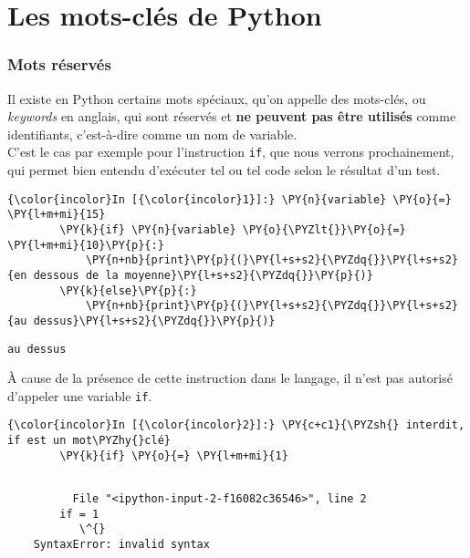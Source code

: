     \hypertarget{les-mots-cluxe9s-de-python}{%
\section{Les mots-clés de Python}\label{les-mots-cluxe9s-de-python}}

    \hypertarget{mots-ruxe9servuxe9s}{%
\subsubsection{Mots réservés}\label{mots-ruxe9servuxe9s}}

    Il existe en Python certains mots spéciaux, qu'on appelle des mots-clés,
ou \emph{keywords} en anglais, qui sont réservés et \textbf{ne peuvent
pas être utilisés} comme identifiants, c'est-à-dire comme un nom de
variable.\\

    C'est le cas par exemple pour l'instruction \texttt{if}, que nous
verrons prochainement, qui permet bien entendu d'exécuter tel ou tel
code selon le résultat d'un test.

    \begin{Verbatim}[commandchars=\\\{\}]
{\color{incolor}In [{\color{incolor}1}]:} \PY{n}{variable} \PY{o}{=} \PY{l+m+mi}{15}
        \PY{k}{if} \PY{n}{variable} \PY{o}{\PYZlt{}}\PY{o}{=} \PY{l+m+mi}{10}\PY{p}{:}
            \PY{n+nb}{print}\PY{p}{(}\PY{l+s+s2}{\PYZdq{}}\PY{l+s+s2}{en dessous de la moyenne}\PY{l+s+s2}{\PYZdq{}}\PY{p}{)}
        \PY{k}{else}\PY{p}{:}
            \PY{n+nb}{print}\PY{p}{(}\PY{l+s+s2}{\PYZdq{}}\PY{l+s+s2}{au dessus}\PY{l+s+s2}{\PYZdq{}}\PY{p}{)}
\end{Verbatim}


    \begin{Verbatim}[commandchars=\\\{\}]
au dessus

    \end{Verbatim}

    À cause de la présence de cette instruction dans le langage, il n'est
pas autorisé d'appeler une variable \texttt{if}.

    \begin{Verbatim}[commandchars=\\\{\}]
{\color{incolor}In [{\color{incolor}2}]:} \PY{c+c1}{\PYZsh{} interdit, if est un mot\PYZhy{}clé}
        \PY{k}{if} \PY{o}{=} \PY{l+m+mi}{1}
\end{Verbatim}


    \begin{Verbatim}[commandchars=\\\{\}]

          File "<ipython-input-2-f16082c36546>", line 2
        if = 1
           \^{}
    SyntaxError: invalid syntax


    \end{Verbatim}


